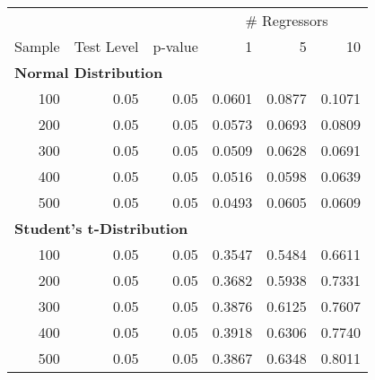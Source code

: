 \begin{table}
\centering
\begin{tabular}{r|r|r|r|r|r}
\hline
\multicolumn{3}{c|}{ } & \multicolumn{3}{c}{\# Regressors} \\
\cline{4-6}
Sample & Test Level & p-value & 1 & 5 & 10\\
\hline
\multicolumn{6}{l}{\textbf{Normal Distribution}}\\
\hline
\hspace{1em}100 & 0.05 & 0.05 & 0.0601 & 0.0877 & 0.1071\\
\hline
\hspace{1em}200 & 0.05 & 0.05 & 0.0573 & 0.0693 & 0.0809\\
\hline
\hspace{1em}300 & 0.05 & 0.05 & 0.0509 & 0.0628 & 0.0691\\
\hline
\hspace{1em}400 & 0.05 & 0.05 & 0.0516 & 0.0598 & 0.0639\\
\hline
\hspace{1em}500 & 0.05 & 0.05 & 0.0493 & 0.0605 & 0.0609\\
\hline
\multicolumn{6}{l}{\textbf{Student's t-Distribution}}\\
\hline
\hspace{1em}100 & 0.05 & 0.05 & 0.3547 & 0.5484 & 0.6611\\
\hline
\hspace{1em}200 & 0.05 & 0.05 & 0.3682 & 0.5938 & 0.7331\\
\hline
\hspace{1em}300 & 0.05 & 0.05 & 0.3876 & 0.6125 & 0.7607\\
\hline
\hspace{1em}400 & 0.05 & 0.05 & 0.3918 & 0.6306 & 0.7740\\
\hline
\hspace{1em}500 & 0.05 & 0.05 & 0.3867 & 0.6348 & 0.8011\\
\hline
\end{tabular}
\end{table}

